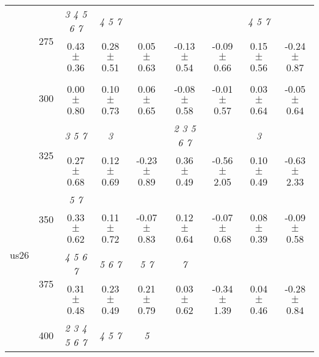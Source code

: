 \begin{table}[h]
{\begin{tabular}{
        ccccccccc}
 & \multirow{2}{*}{275}& \cellcolor[HTML]{EFEFEF} \textit{ 3 4 5 6 7 }& \cellcolor[HTML]{EFEFEF} \textit{ 4 5 7 }& \cellcolor[HTML]{EFEFEF} & \cellcolor[HTML]{EFEFEF} & \cellcolor[HTML]{EFEFEF} & \cellcolor[HTML]{EFEFEF} \textit{ 4 5 7 }& \cellcolor[HTML]{EFEFEF}  \\ 
 & & \cellcolor[HTML]{EFEFEF} 0.43 $\pm$ 0.36& \cellcolor[HTML]{EFEFEF} 0.28 $\pm$ 0.51& \cellcolor[HTML]{EFEFEF} 0.05 $\pm$ 0.63& \cellcolor[HTML]{EFEFEF} -0.13 $\pm$ 0.54& \cellcolor[HTML]{EFEFEF} -0.09 $\pm$ 0.66& \cellcolor[HTML]{EFEFEF} 0.15 $\pm$ 0.56& \cellcolor[HTML]{EFEFEF} -0.24 $\pm$ 0.87 \\ 
 & \multirow{2}{*}{300}& & & & & & &  \\ 
 & & 0.00 $\pm$ 0.80& 0.10 $\pm$ 0.73& 0.06 $\pm$ 0.65& -0.08 $\pm$ 0.58& -0.01 $\pm$ 0.57& 0.03 $\pm$ 0.64& -0.05 $\pm$ 0.64 \\ 
 & \multirow{2}{*}{325}& \cellcolor[HTML]{EFEFEF} \textit{ 3 5 7 }& \cellcolor[HTML]{EFEFEF} \textit{ 3 }& \cellcolor[HTML]{EFEFEF} & \cellcolor[HTML]{EFEFEF} \textit{ 2 3 5 6 7 }& \cellcolor[HTML]{EFEFEF} & \cellcolor[HTML]{EFEFEF} \textit{ 3 }& \cellcolor[HTML]{EFEFEF}  \\ 
 & & \cellcolor[HTML]{EFEFEF} 0.27 $\pm$ 0.68& \cellcolor[HTML]{EFEFEF} 0.12 $\pm$ 0.69& \cellcolor[HTML]{EFEFEF} -0.23 $\pm$ 0.89& \cellcolor[HTML]{EFEFEF} 0.36 $\pm$ 0.49& \cellcolor[HTML]{EFEFEF} -0.56 $\pm$ 2.05& \cellcolor[HTML]{EFEFEF} 0.10 $\pm$ 0.49& \cellcolor[HTML]{EFEFEF} -0.63 $\pm$ 2.33 \\ 
 \multirow{4}{*}{us26} & \multirow{2}{*}{350}& \textit{ 5 7 }& & & & & &  \\ 
 & & 0.33 $\pm$ 0.62& 0.11 $\pm$ 0.72& -0.07 $\pm$ 0.83& 0.12 $\pm$ 0.64& -0.07 $\pm$ 0.68& 0.08 $\pm$ 0.39& -0.09 $\pm$ 0.58 \\ 
 & \multirow{2}{*}{375}& \cellcolor[HTML]{EFEFEF} \textit{ 4 5 6 7 }& \cellcolor[HTML]{EFEFEF} \textit{ 5 6 7 }& \cellcolor[HTML]{EFEFEF} \textit{ 5 7 }& \cellcolor[HTML]{EFEFEF} \textit{ 7 }& \cellcolor[HTML]{EFEFEF} & \cellcolor[HTML]{EFEFEF} & \cellcolor[HTML]{EFEFEF}  \\ 
 & & \cellcolor[HTML]{EFEFEF} 0.31 $\pm$ 0.48& \cellcolor[HTML]{EFEFEF} 0.23 $\pm$ 0.49& \cellcolor[HTML]{EFEFEF} 0.21 $\pm$ 0.79& \cellcolor[HTML]{EFEFEF} 0.03 $\pm$ 0.62& \cellcolor[HTML]{EFEFEF} -0.34 $\pm$ 1.39& \cellcolor[HTML]{EFEFEF} 0.04 $\pm$ 0.46& \cellcolor[HTML]{EFEFEF} -0.28 $\pm$ 0.84 \\ 
 & \multirow{2}{*}{400}& \textit{ 2 3 4 5 6 7 }& \textit{ 4 5 7 }& \textit{ 5 }& & & &  \\ 

\end{tabular}}
\end{table}
